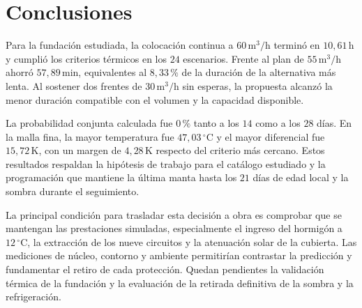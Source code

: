 \section{Conclusiones}
\label{sec:conclusiones}

Para la fundación estudiada, la colocación continua a $60\,\mathrm{m^3/h}$ terminó en $10{,}61\,\mathrm h$ y cumplió los criterios térmicos en los $24$ escenarios. Frente al plan de $55\,\mathrm{m^3/h}$ ahorró $57{,}89\,\mathrm{min}$, equivalentes al $8{,}33\,\text{\%}$ de la duración de la alternativa más lenta. Al sostener dos frentes de $30\,\mathrm{m^3/h}$ sin esperas, la propuesta alcanzó la menor duración compatible con el volumen y la capacidad disponible.

La probabilidad conjunta calculada fue $0\,\text{\%}$ tanto a los $14$ como a los $28$ días. En la malla fina, la mayor temperatura fue $47{,}03\,^\circ\mathrm C$ y el mayor diferencial fue $15{,}72\,\mathrm K$, con un margen de $4{,}28\,\mathrm K$ respecto del criterio más cercano. Estos resultados respaldan la hipótesis de trabajo para el catálogo estudiado y la programación que mantiene la última manta hasta los $21$ días de edad local y la sombra durante el seguimiento.

La principal condición para trasladar esta decisión a obra es comprobar que se mantengan las prestaciones simuladas, especialmente el ingreso del hormigón a $12\,^\circ\mathrm C$, la extracción de los nueve circuitos y la atenuación solar de la cubierta. Las mediciones de núcleo, contorno y ambiente permitirían contrastar la predicción y fundamentar el retiro de cada protección. Quedan pendientes la validación térmica de la fundación y la evaluación de la retirada definitiva de la sombra y la refrigeración.
